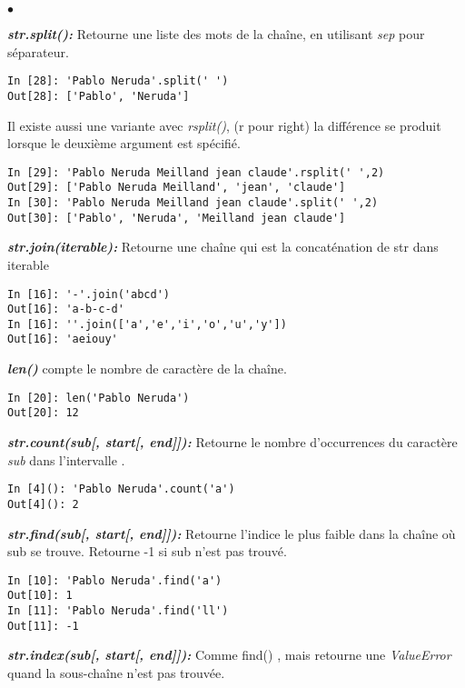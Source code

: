 \documentclass[10pt,dvipsnames,  dvips]{article}
\begin{document}
\begin{list}{$\bullet$}{}
\item \textit{\textbf{str.split(): }} Retourne une liste des mots de la chaîne, en utilisant \textit{sep} pour séparateur.


\begin{lstlisting}
In [28]: 'Pablo Neruda'.split(' ')
Out[28]: ['Pablo', 'Neruda']
\end{lstlisting}

Il existe aussi une variante avec  \textit{rsplit()}, (r pour right) la différence  se produit lorsque le deuxième argument est spécifié.

\begin{lstlisting}
In [29]: 'Pablo Neruda Meilland jean claude'.rsplit(' ',2)
Out[29]: ['Pablo Neruda Meilland', 'jean', 'claude']
In [30]: 'Pablo Neruda Meilland jean claude'.split(' ',2)
Out[30]: ['Pablo', 'Neruda', 'Meilland jean claude']
\end{lstlisting}
\item \textit{\textbf{str.join(iterable): }} Retourne une chaîne qui est la concaténation de str dans iterable
\begin{lstlisting}
In [16]: '-'.join('abcd')
Out[16]: 'a-b-c-d'
In [16]: ''.join(['a','e','i','o','u','y'])
Out[16]: 'aeiouy'
\end{lstlisting}
\item  \textit{\textbf{len()}} compte le nombre de caractère de la chaîne.
\begin{lstlisting}
In [20]: len('Pablo Neruda')
Out[20]: 12
\end{lstlisting}
\item \textit{\textbf{str.count(sub[, start[, end]]): }} Retourne le nombre d'occurrences du caractère \textit{sub} dans l'intervalle .
\begin{lstlisting}
In [4](): 'Pablo Neruda'.count('a')
Out[4](): 2
\end{lstlisting}
\item \textit{\textbf{ str.find(sub[, start[, end]]): }} Retourne l'indice le plus faible dans la chaîne où sub se trouve. Retourne -1 si sub n'est pas trouvé.
\begin{lstlisting}
In [10]: 'Pablo Neruda'.find('a')
Out[10]: 1
In [11]: 'Pablo Neruda'.find('ll')
Out[11]: -1
\end{lstlisting}
\item \textit{\textbf{str.index(sub[, start[, end]]): }} Comme find() , mais retourne une \textit{ValueError} quand la sous-chaîne n'est pas trouvée.

\end{list}
\end{document}
